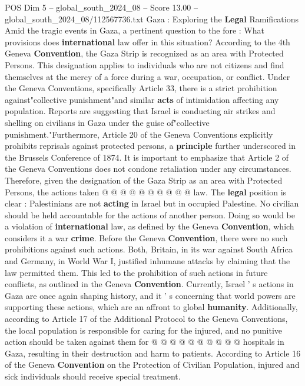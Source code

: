 \begin{textsample}{POS Dim 5 – global\_south\_2024\_08 – Score 13.00 – global\_south\_2024\_08/112567736.txt}  \label{ex:f5_pos_325}
Gaza : Exploring the \textbf{Legal} Ramifications Amid the tragic events in Gaza, a pertinent question to the fore : What provisions does \textbf{international} law offer in this situation?
According to the 4th Geneva \textbf{Convention}, the Gaza Strip is recognized as an area with Protected Persons.
This designation applies to individuals who are not citizens and find themselves at the mercy of a force during a war, occupation, or conflict.
Under the Geneva Conventions, specifically Article 33, there is a strict prohibition against"collective punishment"and similar \textbf{acts} of intimidation affecting any population.
Reports are suggesting that Israel is conducting air strikes and shelling on civilians in Gaza under the guise of"collective punishment."Furthermore, Article 20 of the Geneva Conventions explicitly prohibits reprisals against protected persons, a \textbf{principle} further underscored in the Brussels Conference of 1874.
It is important to emphasize that Article 2 of the Geneva Conventions does not condone retaliation under any circumstances.
Therefore, given the designation of the Gaza Strip as an area with Protected Persons, the actions taken @ @ @ @ @ @ @ @ @ @ law.
The \textbf{legal} position is clear : Palestinians are not \textbf{acting} in Israel but in occupied Palestine.
No civilian should be held accountable for the actions of another person.
Doing so would be a violation of \textbf{international} law, as defined by the Geneva \textbf{Convention}, which considers it a war \textbf{crime}.
Before the Geneva \textbf{Convention}, there were no such prohibitions against such actions.
Both, Britain, in its war against South Africa and Germany, in World War I, justified inhumane attacks by claiming that the law permitted them.
This led to the prohibition of such actions in future conflicts, as outlined in the Geneva \textbf{Convention}.
Currently, Israel ' s actions in Gaza are once again shaping history, and it ' s concerning that world powers are supporting these actions, which are an affront to global \textbf{humanity}.
Additionally, according to Article 17 of the Additional Protocol to the Geneva Conventions, the local population is responsible for caring for the injured, and no punitive action should be taken against them for @ @ @ @ @ @ @ @ @ @ hospitals in Gaza, resulting in their destruction and harm to patients.
According to Article 16 of the Geneva \textbf{Convention} on the Protection of Civilian Population, injured and sick individuals should receive special treatment.

\end{textsample}
